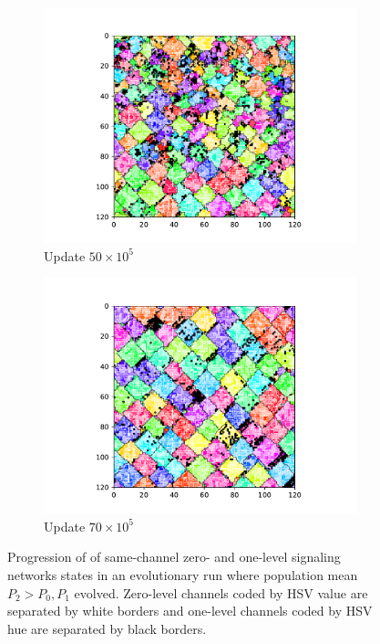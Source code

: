 \begin{figure}[t]
\begin{center}
\begin{subfigure}[b]{0.5\columnwidth}
  \includegraphics[width=\columnwidth,trim={2.5cm 0.5cm 2.5cm 1cm},clip]{img/ChannelMap_1011_update5000000}
  \caption{Update $50 \times 10^{5}$}
  \label{fig:ChannelMap_1011_update5000000}
\end{subfigure}%
\begin{subfigure}[b]{0.5\columnwidth}
  \includegraphics[width=\columnwidth,trim={2.5cm 0.5cm 2.5cm 1cm},clip]{img/ChannelMap_1011_update7000000}
  \caption{Update $70 \times 10^{5}$}
  \label{fig:ChannelMap_1011_update7000000}
\end{subfigure}
\caption{
Progression of of same-channel zero- and one-level signaling networks states in an evolutionary run where population mean $P_2 > P_0, P_1$ evolved.
Zero-level channels coded by HSV value are separated by white borders and one-level channels coded by HSV hue are separated by black borders.
}
\label{fig:grid_progession}
\end{center}
\end{figure}

